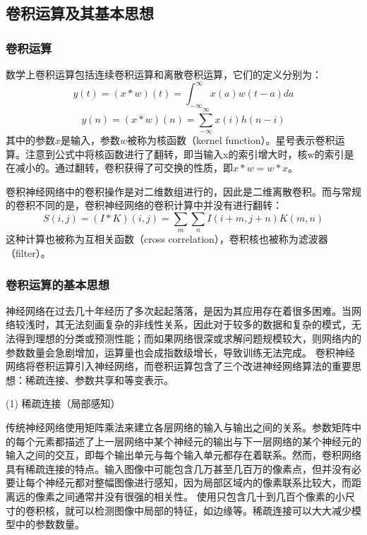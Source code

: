 \subsection{卷积运算及其基本思想}
\subsubsection{卷积运算}
数学上卷积运算包括连续卷积运算和离散卷积运算，它们的定义分别为：
%
\begin{equation}\label{eq:3_1_0}
y(t) = (x*w)(t) = \int_{-\infty}^{\infty}x(a)w(t-a)da
\end{equation}
\begin{equation}
y(n) = (x*w)(n) = \sum_{-\infty}^{\infty}x(i)h(n-i)
\end{equation}
其中的参数$x$是输入，参数$w$被称为核函数（kernel function）。星号表示卷积运算。注意到公式中将核函数进行了翻转，即当输入x的索引增大时，核w的索引是在减小的。通过翻转，卷积获得了可交换的性质，即$x*w=w*x$。

卷积神经网络中的卷积操作是对二维数组进行的，因此是二维离散卷积。而与常规的卷积不同的是，卷积神经网络的卷积计算中并没有进行翻转：
%
\begin{equation}
S(i,j) = (I*K)(i,j) = \sum\limits_{m} \sum\limits_{n} I(i+m,j+n)K(m,n)
\end{equation}
这种计算也被称为互相关函数（cross correlation），卷积核也被称为滤波器（filter）。

\subsubsection{卷积运算的基本思想}
神经网络在过去几十年经历了多次起起落落，是因为其应用存在着很多困难。当网络较浅时，其无法刻画复杂的非线性关系，因此对于较多的数据和复杂的模式，无法得到理想的分类或预测性能；而如果网络很深或求解问题规模较大，则网络内的参数数量会急剧增加，运算量也会成指数级增长，导致训练无法完成。
卷积神经网络将卷积运算引入神经网络，而卷积运算包含了三个改进神经网络算法的重要思想：稀疏连接、参数共享和等变表示。

(1) 稀疏连接（局部感知）

传统神经网络使用矩阵乘法来建立各层网络的输入与输出之间的关系。参数矩阵中的每个元素都描述了上一层网络中某个神经元的输出与下一层网络的某个神经元的输入之间的交互，即每个输出单元与每个输入单元都存在着联系。然而，卷积网络具有稀疏连接的特点。输入图像中可能包含几万甚至几百万的像素点，但并没有必要让每个神经元都对整幅图像进行感知，因为局部区域内的像素联系比较大，而距离远的像素之间通常并没有很强的相关性。
使用只包含几十到几百个像素的小尺寸的卷积核，就可以检测图像中局部的特征，如边缘等。稀疏连接可以大大减少模型中的参数数量。


